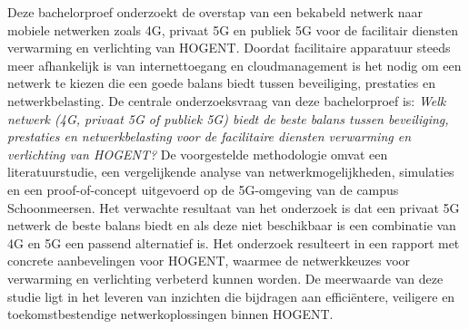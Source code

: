 Deze bachelorproef onderzoekt de overstap van een bekabeld netwerk naar mobiele netwerken zoals 4G, privaat 5G en publiek 5G voor de facilitair diensten verwarming en verlichting van HOGENT. Doordat facilitaire apparatuur steeds meer afhankelijk is van internettoegang en cloudmanagement is het nodig om een netwerk te kiezen die een goede balans biedt tussen beveiliging, prestaties en netwerkbelasting. De centrale onderzoeksvraag van deze bachelorproef is: \textit{Welk netwerk (4G, privaat 5G of publiek 5G) biedt de beste balans tussen beveiliging, prestaties en netwerkbelasting voor de facilitaire diensten verwarming en verlichting van HOGENT?} De voorgestelde methodologie omvat een literatuurstudie, een vergelijkende analyse van netwerkmogelijkheden, simulaties en een proof-of-concept uitgevoerd op de 5G-omgeving van de campus Schoonmeersen. Het verwachte resultaat van het onderzoek is dat een privaat 5G netwerk de beste balans biedt en als deze niet beschikbaar is een combinatie van 4G en 5G een passend alternatief is. Het onderzoek resulteert in een rapport met concrete aanbevelingen voor HOGENT, waarmee de netwerkkeuzes voor verwarming en verlichting verbeterd kunnen worden. De meerwaarde van deze studie ligt in het leveren van inzichten die bijdragen aan efficiëntere, veiligere en toekomstbestendige netwerkoplossingen binnen HOGENT.
